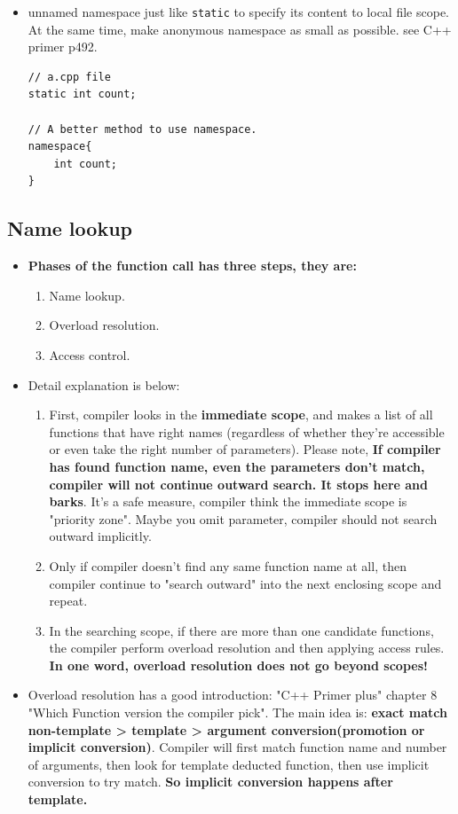 \documentclass[a4paper,11pt,twoside]{book}
\begin{document}
\begin{itemize}
	\item unnamed namespace just like \texttt{static} to specify its content to local file scope. At the same time, make anonymous namespace as small as possible.  see C++ primer p492.
	
\begin{lstlisting}[numbers=none]
// a.cpp file
static int count;
	
// A better method to use namespace.
namespace{
	int count;
}
\end{lstlisting}
	
\end{itemize}


\subsection{Name lookup}
\begin{itemize}
	
	\item \textbf{Phases of the function call has three steps, they are:}
	\begin{enumerate}
		\item Name lookup.
		\item Overload resolution.
		\item Access control.
	\end{enumerate}
	
	\item Detail explanation is below:
	\begin{enumerate}
		\item First, compiler looks in the \textbf{immediate scope},  and makes a list of all functions that have right names  (regardless of whether they're accessible or even take the right number of parameters). Please note, \textbf{If compiler has found function name, even the parameters don't match, compiler will not continue outward search. It stops here and barks}. It's a safe measure, compiler think the immediate scope is "priority zone". Maybe you omit parameter, compiler should not search outward implicitly. 
		
		\item Only if compiler doesn't find any same function name at all, then compiler continue to "search outward" into the next enclosing scope and repeat.
		
		\item In the searching scope, if there are more than one candidate functions, the compiler perform overload resolution and then applying access rules. \textbf{In one word, overload resolution does not go beyond scopes!}
	\end{enumerate}
	
	
	\item Overload resolution has a good introduction: "C++ Primer plus" chapter 8 "Which Function version the compiler pick". The main idea is: \textbf{exact match non-template > template > argument conversion(promotion or implicit conversion)}. Compiler will first match function name and number of arguments, then look for template deducted function, then use implicit conversion to try match. \textbf{So implicit conversion happens after template.}
\end{itemize}
\end{document}
